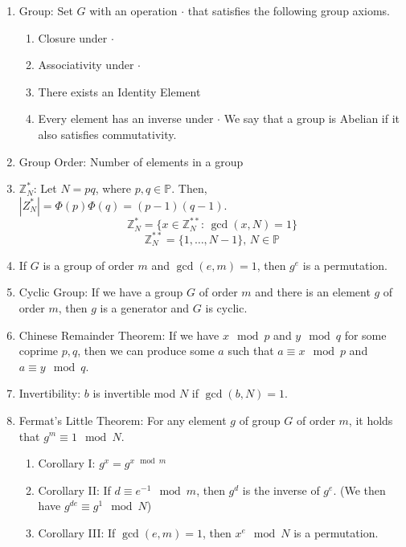 \documentclass[12pt,letterpaper]{article}
\begin{document}
\begin{enumerate}
\begin{enumerate}
\begin{algorithmic}
        \begin{algorithm}
            \Else
            \EndIf
        \EndFunction
        \end{algorithm}
        \end{algorithmic}
        	\item Group: Set $G$ with an operation $\cdot$ that satisfies the following group axioms.
        	\begin{enumerate}
        		\item Closure under $\cdot$
        		\item Associativity under $\cdot$
        		\item There exists an Identity Element
        		\item Every element has an inverse under $\cdot$
        		We say that a group is Abelian if it also satisfies commutativity.
        	\end{enumerate}
        	\item Group Order: Number of elements in a group
        	\item $\mathbb{Z}_N^*$: Let $N=pq$, where $p,q\in\mathbb{P}$. Then, $|Z_N^*|=\Phi(p)\Phi(q)=(p-1)(q-1)$.
        	\[\mathbb{Z}_N^*=\{x\in\mathbb{Z}_N^{**}\text{: $\gcd(x,N)=1$}\}\]
        	\[\mathbb{Z}_N^{**}=\{1,\ldots,N-1\}\text{, $N\in\mathbb{P}$}\]
        	\item If $G$ is a group of order $m$ and $\gcd(e,m)=1$, then $g^e$ is a permutation.
			\item Cyclic Group: If we have a group $G$ of order $m$ and there is an element $g$ of order $m$, then $g$ is a generator and $G$ is cyclic.		
			\item Chinese Remainder Theorem: If we have $x\mod p$ and $y\mod q$ for some coprime $p,q$, then we can produce some $a$ such that $a\equiv x\mod p$ and $a\equiv y\mod q$.
			\item Invertibility: $b$ is invertible mod $N$ if $\gcd(b,N)=1$.
			\item Fermat's Little Theorem: For any element $g$ of group $G$ of order $m$, it holds that $g^m\equiv 1\mod N$.
			\begin{enumerate}
				\item Corollary I: $g^x=g^{x\mod m}$
				\item Corollary II: If $d\equiv e^{-1}\mod m$, then $g^d$ is the inverse of $g^e$. (We then have $g^{de}\equiv g^1\mod N$)
				\item Corollary III: If $\gcd(e,m)=1$, then $x^e\mod N$ is a permutation.
			\end{enumerate}
		\end{enumerate}
		

\end{enumerate}
\end{document}
